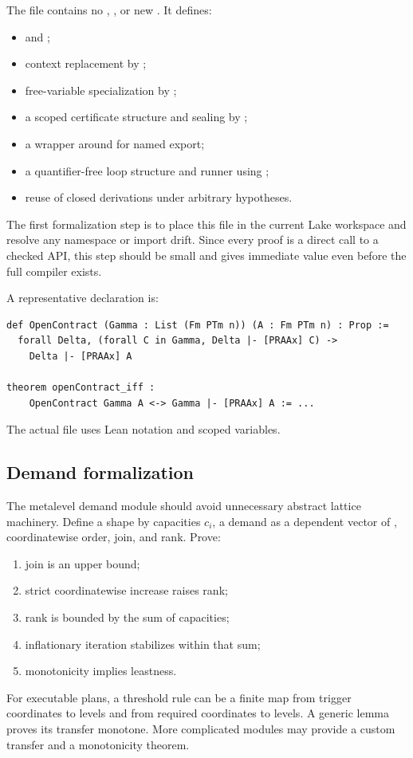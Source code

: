 The file  contains no
, , or new .  It defines:
\begin{itemize}
  \item {} and ;
  \item context replacement by ;
  \item free-variable specialization by ;
  \item a scoped certificate structure and sealing by ;
  \item a wrapper around  for named export;
  \item a quantifier-free loop structure and runner using ;
  \item reuse of closed derivations under arbitrary hypotheses.
\end{itemize}
The first formalization step is to place this file in the current Lake
workspace and resolve any namespace or import drift.  Since every proof is a
direct call to a checked API, this step should be small and gives immediate
value even before the full compiler exists.

A representative declaration is:
\begin{lstlisting}[language={}]
def OpenContract (Gamma : List (Fm PTm n)) (A : Fm PTm n) : Prop :=
  forall Delta, (forall C in Gamma, Delta |- [PRAAx] C) ->
    Delta |- [PRAAx] A

theorem openContract_iff :
    OpenContract Gamma A <-> Gamma |- [PRAAx] A := ...
\end{lstlisting}
The actual file uses Lean notation and scoped variables.

\subsection{Demand formalization}

The metalevel demand module should avoid unnecessary abstract lattice
machinery.  Define a shape by capacities \(c_i\), a demand as a dependent
vector of , coordinatewise order, join, and rank.  Prove:
\begin{enumerate}
  \item join is an upper bound;
  \item strict coordinatewise increase raises rank;
  \item rank is bounded by the sum of capacities;
  \item inflationary iteration stabilizes within that sum;
  \item monotonicity implies leastness.
\end{enumerate}
For executable plans, a threshold rule can be a finite map from trigger
coordinates to levels and from required coordinates to levels.  A generic
lemma proves its transfer monotone.  More complicated modules may provide a
custom transfer and a monotonicity theorem.

